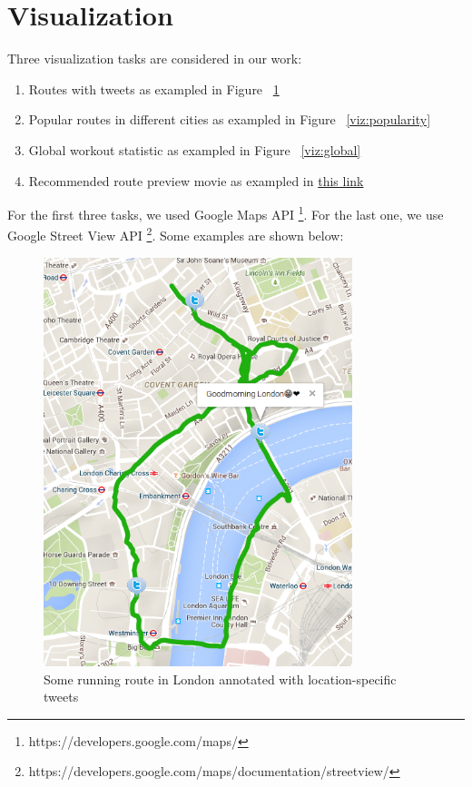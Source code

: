\section{Visualization}

Three visualization tasks are considered in our work: 

\begin{enumerate}
\item Routes with tweets as exampled in Figure ~\ref{viz:social}
\item Popular routes in different cities as exampled in Figure ~\ref{viz:popularity}
\item Global workout statistic as exampled in Figure ~\ref{viz:global}
\item Recommended route preview movie as exampled in \href{http://www.cs.helsinki.fi/u/hxiao/ah/viz/route\_animation/examples/movie.html#route_path=london\_route.json}{this link}
\end{enumerate}

For the first three tasks, we used Google Maps API \footnote{https://developers.google.com/maps/}. For the last one, we use Google Street View API \footnote{https://developers.google.com/maps/documentation/streetview/}.
Some examples are shown below:


\begin{figure}[h]
\centering
\includegraphics[width=90mm]{imgs/tweet.png}
\caption{Some running route in London annotated with location-specific tweets \label{viz:social}}
\end{figure}

